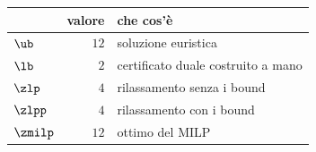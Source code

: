 \begin{center}\small
\begin{tabular}{lrl}
\toprule
 & valore & che cos'è \\
\midrule
$\ub$ & $12$ & soluzione euristica \\
$\lb$ & $2$ & certificato duale costruito a mano \\
$\zlp$ & $4$ & rilassamento senza i bound \\
$\zlpp$ & $4$ & rilassamento con i bound \\
$\zmilp$ & $12$ & ottimo del MILP \\
\bottomrule
\end{tabular}
\end{center}
